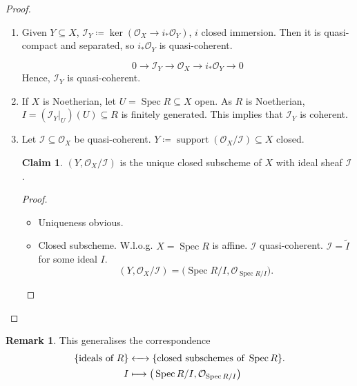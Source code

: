 \documentclass[12pt]{article}
\DeclareMathOperator{\Spec}{Spec}
\DeclareMathOperator{\support}{support}
\theoremstyle{definition}
\newtheorem*{remark}{Remark}
\newtheorem*{claim}{Claim}
\theoremstyle{remark}
\begin{document}
\begin{proof}
\begin{enumerate}[label=\arabic*)]
\item Given $Y\subseteq X$, $\mathcal{I}_Y\coloneqq\ker(\mathcal{O}_X\rightarrow i_*\mathcal{O}_Y)$, $i$ closed immersion. Then it is quasi-compact and separated, so $i_*\mathcal{O}_Y$ is quasi-coherent.

\[0\longrightarrow\mathcal{I}_Y\longrightarrow\mathcal{O}_X\longrightarrow i_*\mathcal{O}_Y\longrightarrow0\]
Hence, $\mathcal{I}_Y$ is quasi-coherent.

\item If $X$ is Noetherian, let $U=\Spec R\subseteq X$ open. As $R$ is Noetherian, $I=(\mathcal{I}_Y|_U)(U)\subseteq R$ is finitely generated. This implies that $\mathcal{I}_Y$ is coherent.

\item Let $\mathcal{I}\subseteq\mathcal{O}_X$ be quasi-coherent. $Y\coloneqq\support(\mathcal{O}_X/\mathcal{I})\subseteq X$ closed.

\begin{claim}
$(Y,\mathcal{O}_X/\mathcal{I})$ is the unique closed subscheme of $X$ with ideal sheaf $\mathcal{I}$.
\end{claim}

\begin{proof}
\begin{itemize}[label=$-$]
\item Uniqueness obvious.

\item Closed subscheme. W.l.o.g. $X=\Spec R$ is affine. $\mathcal{I}$ quasi-coherent. $\mathcal{I}=\widetilde{I}$ for some ideal $I$.
\[(Y,\mathcal{O}_X/\mathcal{I})=\big(\Spec R/I,\mathcal{O}_{\Spec R/I}\big).\]
\end{itemize}
\end{proof}
\end{enumerate}
\end{proof}

\begin{remark}
This generalises the correspondence
\begin{align*}
\{\text{ideals of }R\}&\xleftrightarrow{\hspace{4.4mm}}\{\text{closed subschemes of }\Spec R\}.\\
I&\longmapsto\big(\Spec R/I,\mathcal{O}_{\Spec R/I}\big)
\end{align*}
\end{remark}
\end{document}
